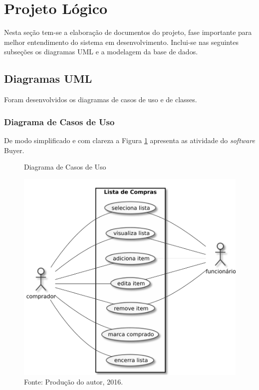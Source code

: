 \documentclass[
	12pt,
	openright,
	oneside, %
	a4paper,
	chapter=TITLE,
	section=TITLE,
	english,
	brazil %
	]{abntex2-udesc}
\begin{document}
\section{Projeto Lógico}

Nesta seção tem-se a elaboração de documentos do projeto, fase importante para melhor entendimento do sistema em desenvolvimento. Inclui-se nas seguintes subseções os diagramas UML e a modelagem da base de dados.

\subsection{Diagramas UML}

Foram desenvolvidos os diagramas de casos de uso e de classes.

\subsubsection{Diagrama de Casos de Uso}

De modo simplificado e com clareza a Figura \ref{fig:usecase} apresenta as atividade do \textit{software} Buyer.

\begin{figure}[h]
\caption{Diagrama de Casos de Uso}\label{fig:usecase}
\centering
\includegraphics{figures/usecase.pdf}
\caption*{\footnotesize Fonte: Produção do autor, 2016.}
\end{figure}
\end{document}
